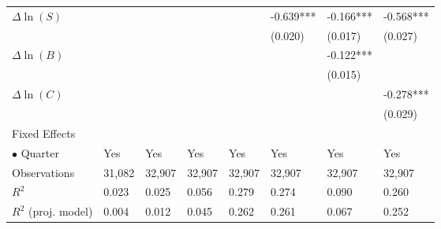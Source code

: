 \documentclass[openany]{book}
\theoremstyle{definition}
\theoremstyle{definition}
\theoremstyle{definition}
\theoremstyle{remark}
\begin{document}
\begin{table}[ht]
\begin{tabularx}{0.975\textwidth}{lYYYYYYY}
  $\Delta\ln(S)$ &  &  &  &  & -0.639*** & -0.166*** & -0.568*** \\ 
   &  &  &  &  & (0.020) & (0.017) & (0.027) \\ 
  $\Delta\ln(B)$ &  &  &  &  &  & -0.122*** &  \\ 
   &  &  &  &  &  & (0.015) &  \\ 
  $\Delta\ln(C)$ &  &  &  &  &  &  & -0.278*** \\ 
   &  &  &  &  &  &  & (0.029) \\ 
  Fixed Effects &  &  &  &  &  &  &  \\ 
  $\bullet$ Quarter & Yes & Yes & Yes & Yes & Yes & Yes & Yes \\ 
  Observations & 31,082 & 32,907 & 32,907 & 32,907 & 32,907 & 32,907 & 32,907 \\ 
  $R^2$ & 0.023 & 0.025 & 0.056 & 0.279 & 0.274 & 0.090 & 0.260 \\ 
  $R^2$ (proj. model) & 0.004 & 0.012 & 0.045 & 0.262 & 0.261 & 0.067 & 0.252 \\ 
   \bottomrule
\end{tabularx}
\endgroup
\end{table}
\end{document}
